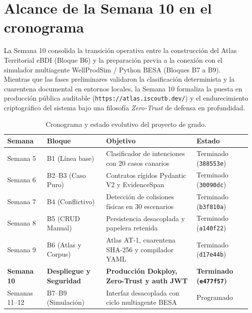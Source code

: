 \documentclass[11pt,a4paper]{article}
\begin{document}
\section{Alcance de la Semana 10 en el cronograma}

La Semana 10 consolida la transici\'on operativa entre la construcci\'on del Atlas Territorial eBDI (Bloque B6) y la preparaci\'on previa a la conexi\'on con el simulador multiagente WellProdSim / Python BESA (Bloques B7 a B9). Mientras que las fases preliminares validaron la clasificaci\'on determinista y la cuarentena documental en entornos locales, la Semana 10 formaliza la puesta en producci\'on p\'ublica auditable (\texttt{https://atlas.iscoutb.dev/}) y el endurecimiento criptogr\'afico del sistema bajo una filosof\'ia \textit{Zero-Trust} de defensa en profundidad.

\begin{table}[H]
\centering
\small
\caption{Cronograma y estado evolutivo del proyecto de grado.}
\label{tab:cronograma}
\begin{tabularx}{\textwidth}{lp{3.4cm}p{5.0cm}X}
\toprule
\textbf{Semana} & \textbf{Bloque} & \textbf{Objetivo} & \textbf{Estado} \\
\midrule
Semana 5 & B1 (L\'inea base) & Clasificador de intenciones con 20 casos canarios & Terminado (\texttt{388553e}) \\
Semana 6 & B2--B3 (Caso Puro) & Contratos r\'igidos Pydantic V2 y EvidenceSpan & Terminado (\texttt{30090dc}) \\
Semana 7 & B4 (Conflictivo) & Detecci\'on de colisiones f\'isicas en 30 escenarios & Terminado (\texttt{b3f810a}) \\
Semana 8 & B5 (CRUD Manual) & Persistencia desacoplada y papelera retenida & Terminado (\texttt{a140f22}) \\
Semana 9 & B6 (Atlas y Corpus) & Atlas AT-1, cuarentena SHA-256 y compilador YAML & Terminado (\texttt{d17e44b}) \\
\textbf{Semana 10} & \textbf{Despliegue y Seguridad} & \textbf{Producci\'on Dokploy, Zero-Trust y auth JWT} & \textbf{Terminado (\texttt{e477f57})} \\
Semanas 11--12 & B7--B9 (Simulaci\'on) & Interfaz desacoplada con ciclo multiagente BESA & Programado \\
\bottomrule
\end{tabularx}
\end{table}
\end{document}

